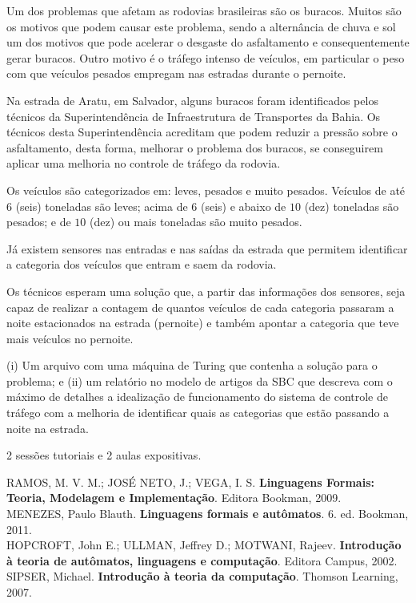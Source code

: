 Um dos problemas que afetam as rodovias brasileiras são os buracos.
Muitos são os motivos que podem causar este problema, sendo a alternância de chuva e sol
um dos motivos que pode acelerar o desgaste do asfaltamento e consequentemente gerar buracos.
Outro motivo é o tráfego intenso de veículos, em particular o peso com que veículos
pesados empregam nas estradas durante o pernoite.

Na estrada de Aratu, em Salvador, alguns buracos foram identificados pelos
técnicos da Superintendência de Infraestrutura de Transportes da Bahia.
Os técnicos desta Superintendência acreditam que
podem reduzir a pressão sobre o asfaltamento, desta forma, melhorar o
problema dos buracos, se conseguirem aplicar uma melhoria no controle de tráfego
da rodovia.

Os veículos são categorizados em: leves, pesados e muito pesados.
Veículos de até $6$ (seis) toneladas são leves;
acima de $6$ (seis) e abaixo de $10$ (dez) toneladas são pesados;
e de $10$ (dez) ou mais toneladas são muito pesados.

Já existem sensores nas entradas e nas saídas da estrada que permitem identificar a
categoria dos veículos que entram e saem da rodovia.

Os técnicos esperam uma solução que, a partir das informações dos
sensores, seja capaz de realizar a contagem de quantos veículos
de cada categoria passaram a noite estacionados na estrada (pernoite) e também apontar
a categoria que teve mais veículos no pernoite.

(i) Um arquivo com uma máquina de Turing que contenha a solução para o
problema; e (ii) um relatório no modelo de artigos da SBC que descreva com o máximo
de detalhes a idealização de funcionamento do sistema de controle de tráfego com a
melhoria de identificar quais as categorias que estão passando a noite na estrada.

2 sessões tutoriais e 2 aulas expositivas.


RAMOS, M. V. M.; JOSÉ NETO, J.; VEGA, I. S. \textbf{Linguagens Formais: Teoria, Modelagem e Implementação}. Editora Bookman, 2009.\\

\noindent
MENEZES, Paulo Blauth. \textbf{Linguagens formais e autômatos}. 6. ed. Bookman, 2011.\\

\noindent
HOPCROFT, John E.; ULLMAN, Jeffrey D.; MOTWANI, Rajeev. \textbf{Introdução à teoria de autômatos, linguagens e computação}. Editora Campus, 2002.\\

\noindent
SIPSER, Michael. \textbf{Introdução à teoria da computação}. Thomson Learning, 2007.
